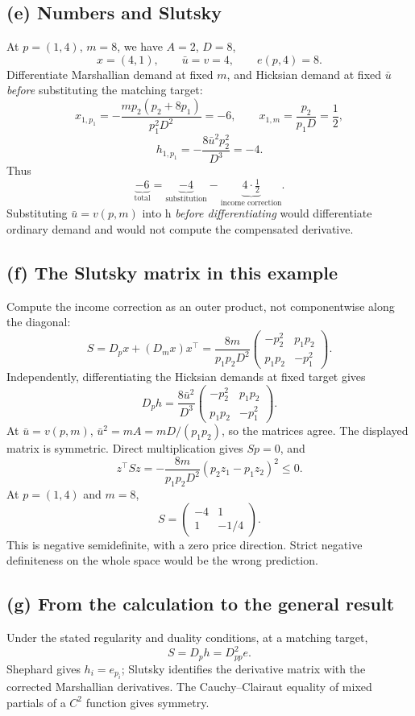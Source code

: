 \documentclass[11pt,a4paper]{article}
\begin{document}
\subsection*{(e) Numbers and Slutsky}
At $p=(1,4)$, $m=8$, we have $A=2$, $D=8$,
\[
 x=(4,1),\qquad \bar u=v=4,\qquad e(p,4)=8.
\]
Differentiate Marshallian demand at fixed $m$, and Hicksian demand at fixed
$\bar u$ \emph{before} substituting the matching target:
\[
 x_{1,p_1}=-\frac{mp_2(p_2+8p_1)}{p_1^2D^2}=-6,
 \qquad x_{1,m}=\frac{p_2}{p_1D}=\frac12,
\]
\[
 h_{1,p_1}=-\frac{8\bar u^2p_2^2}{D^3}=-4.
\]
Thus
\[
 \underbrace{-6}_{\text{total}}=
 \underbrace{-4}_{\text{substitution}}
 -\underbrace{4\cdot\tfrac12}_{\text{income correction}}.
\]
Substituting $\bar u=v(p,m)$ into h \emph{before differentiating} would
differentiate ordinary demand and would not compute the compensated derivative.

\subsection*{(f) The Slutsky matrix in this example}
Compute the income correction as an outer product, not componentwise
along the diagonal:
\[
 S=D_px+(D_mx)x^\top
 =\frac{8m}{p_1p_2D^2}
 \begin{pmatrix}-p_2^2&p_1p_2\\p_1p_2&-p_1^2\end{pmatrix}.
\]
Independently, differentiating the Hicksian demands at fixed target gives
\[
 D_ph=\frac{8\bar u^2}{D^3}
 \begin{pmatrix}-p_2^2&p_1p_2\\p_1p_2&-p_1^2\end{pmatrix}.
\]
At $\bar u=v(p,m)$, $\bar u^2=mA=mD/(p_1p_2)$, so the matrices agree.
The displayed matrix is symmetric. Direct multiplication gives $Sp=0$, and
\[
 z^\top Sz=-\frac{8m}{p_1p_2D^2}(p_2z_1-p_1z_2)^2\le0.
\]
At $p=(1,4)$ and $m=8$,
\[
 S=\begin{pmatrix}-4&1\\1&-1/4\end{pmatrix}.
\]
This is negative semidefinite, with a zero price direction. Strict negative
definiteness on the whole space would be the wrong prediction.

\subsection*{(g) From the calculation to the general result}
Under the stated regularity and duality conditions, at a matching target,
\[
 S=D_ph=D^2_{pp}e.
\]
Shephard gives $h_i=e_{p_i}$; Slutsky identifies the derivative matrix with
the corrected Marshallian derivatives. The Cauchy--Clairaut equality of mixed
partials of a $C^2$ function gives symmetry.
\end{document}
